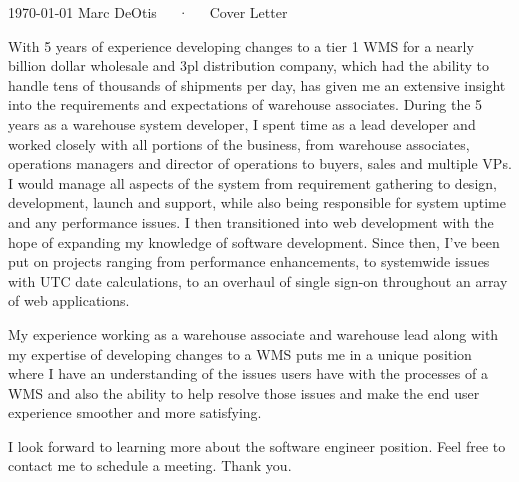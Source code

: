 \documentclass[11pt, letterpaper]{awesome-cv-cover}
\begin{document}
\makecvheader[C]

\makecvfooter
  {\today}
  {Marc DeOtis~~~·~~~Cover Letter}
  {}

\makelettertitle

\begin{cvletter}

With 5 years of experience developing changes to a tier 1 WMS for a nearly billion dollar wholesale and 3pl distribution company, which had the ability to handle tens of thousands of shipments per day, has given me an extensive insight into the requirements and expectations of warehouse associates.  During the 5 years as a warehouse system developer, I spent time as a lead developer and worked closely with all portions of the business, from warehouse associates, operations managers and director of operations to buyers, sales and multiple VPs.  I would manage all aspects of the system from requirement gathering to design, development, launch and support, while also being responsible for system uptime and any performance issues.  I then transitioned into web development with the hope of expanding my knowledge of software development.  Since then, I've been put on projects ranging from performance enhancements, to systemwide issues with UTC date calculations, to an overhaul of single sign-on throughout an array of web applications.

My experience working as a warehouse associate and warehouse lead along with my expertise of developing changes to a WMS puts me in a unique position where I have an understanding of the issues users have with the processes of a WMS and also the ability to help resolve those issues and make the end user experience smoother and more satisfying.

I look forward to learning more about the software engineer position.  Feel free to contact me to schedule a meeting.  Thank you.
\end{cvletter}


\makeletterclosing
\end{document}
